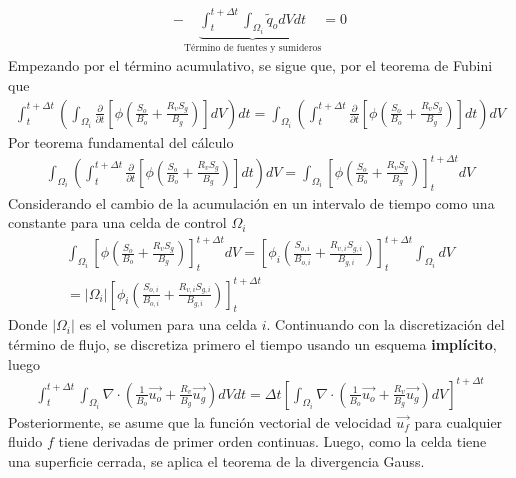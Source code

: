 \begin{appendix}
\begin{align*}
- \underbrace{\int_{t}^{t+\Delta t}\int_{\Omega_{i}}\tilde{q}_{o}dVdt}_{\text{Término de fuentes y sumideros}}=0 
\end{align*}
Empezando por el término acumulativo, se sigue que, por el teorema de Fubini que
\begin{align*}
	\int_{t}^{t+\Delta t}\left(\int_{\Omega_{i}}\frac{\partial}{\partial t} \left[ \phi \left( \frac{S_{o}}{B_{o}} + \frac{R_{v} S_{g}}{B_{g}} \right) \right]dV\right)dt = \int_{\Omega_{i}}\left(\int_{t}^{t+\Delta t}\frac{\partial}{\partial t} \left[ \phi \left( \frac{S_{o}}{B_{o}} + \frac{R_{v} S_{g}}{B_{g}} \right) \right]dt\right)dV 
\end{align*}
Por teorema fundamental del cálculo
\begin{align*}
 \int_{\Omega_{i}}\left(\int_{t}^{t+\Delta t}\frac{\partial}{\partial t} \left[ \phi \left( \frac{S_{o}}{B_{o}} + \frac{R_{v} S_{g}}{B_{g}} \right) \right]dt\right)dV = \int_{\Omega_{i}}\left[ \phi \left( \frac{S_{o}}{B_{o}} + \frac{R_{v} S_{g}}{B_{g}} \right) \right]^{t+\Delta t}_{t}dV
\end{align*}
Considerando el cambio de la acumulación en un intervalo de tiempo como una constante para una celda de control $\Omega_{i}$
\begin{align*}
	\int_{\Omega_{i}}\left[ \phi \left( \frac{S_{o}}{B_{o}} + \frac{R_{v} S_{g}}{B_{g}} \right) \right]^{t+\Delta t}_{t}dV = \left[ \phi_{i} \left( \frac{S_{o,i}}{B_{o,i}} + \frac{R_{v,i} S_{g,i}}{B_{g,i}} \right) \right]^{t+\Delta t}_{t}\int_{\Omega_{i}}dV \\= |\Omega_{i}|\left[ \phi_{i} \left( \frac{S_{o,i}}{B_{o,i}} + \frac{R_{v,i} S_{g,i}}{B_{g,i}} \right) \right]^{t+\Delta t}_{t}
\end{align*}
Donde $|\Omega_{i}|$ es el volumen para una celda $i$. Continuando con la discretización del término de flujo, se discretiza primero el tiempo usando un esquema \textbf{implícito}, luego
\begin{align*}
\int_{t}^{t+\Delta t}\int_{\Omega_{i}}\nabla \cdot \left( \frac{1}{B_{o}} \vec{u_{o}} + \frac{R_{v}}{B_{g}} \vec{u_{g}} \right)dVdt = \Delta t \left[\int_{\Omega_{i}}\nabla \cdot \left( \frac{1}{B_{o}} \vec{u_{o}} + \frac{R_{v}}{B_{g}} \vec{u_{g}} \right)dV\right]^{t+\Delta t}
\end{align*}
Posteriormente, se asume que la función vectorial de velocidad $\vec{u_{f}}$ para cualquier fluido $f$ tiene derivadas de primer orden continuas. Luego, como la celda tiene una superficie cerrada, se aplica el teorema de la divergencia Gauss.
\begin{align*}

\end{align*}
\end{appendix}
